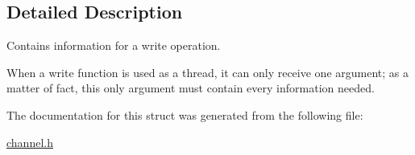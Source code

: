 \subsection{Detailed Description}
Contains information for a write operation. 

When a write function is used as a thread, it can only receive one argument; as a matter of fact, this only argument must contain every information needed. 

The documentation for this struct was generated from the following file\-:\begin{DoxyCompactItemize}
\item 
\hyperlink{channel_8h}{channel.\-h}\end{DoxyCompactItemize}

